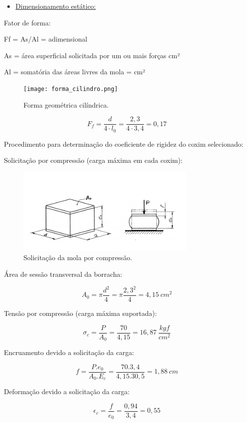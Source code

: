 \begin{itemize}
	\item \underline{Dimensionamento estático:}
\end{itemize}

\noindent Fator de forma: 

\noindent Ff = As/Al = adimensional

\noindent As = área superficial solicitada por um ou mais forças cm²

\noindent Al = somatória das áreas livres da mola = cm²

\begin{figure}[H]
	\centering
	\texttt{[image: forma\_cilindro.png]}
	\caption{Forma geométrica cilíndrica.}
\end{figure}

\[F_f = \frac{d}{4 \cdot l_0} = \frac{2,3}{4 \cdot 3,4} = 0,17\]


\noindent Procedimento para determinação do coeficiente de rigidez do coxim selecionado:

\noindent Solicitação por compressão (carga máxima em cada coxim):

\begin{figure}[H]
	\centering
	\includegraphics[width=250pt]{figuras/compressao.png}
	\caption{Solicitação da mola por compressão.}
\end{figure}

\noindent Área de sessão transversal da borracha:


\[A_0= \pi \frac{d^2}{4}= \pi \frac{2,3^2}{4} = 4,15 \ cm^2\]


\noindent Tensão por compressão (carga máxima suportada):

\[{\sigma}_c = \frac{P}{A_0} = \frac{70}{4,15} = 16,87 \ \frac{kgf}{cm^2}\]

\noindent Encruamento devido a solicitação da carga:

\[f = \frac{P.e_0}{A_0.E_c} = \frac{70.3,4}{4,15.30,5} = 1,88 \ cm\] 

\noindent Deformação devido a solicitação da carga:

\[{\epsilon }_c=\frac{f}{e_0}=\frac{0,94}{3,4}=0,55\] 


